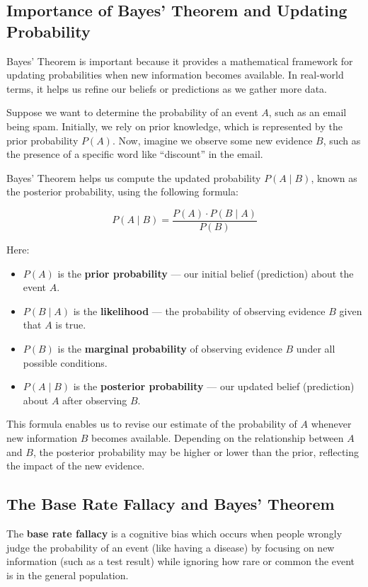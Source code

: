 \documentclass[twoside]{book}
\begin{document}
\subsection{Importance of Bayes' Theorem and Updating Probability}

Bayes’ Theorem is important because it provides a mathematical framework for updating probabilities when new information becomes available. In real-world terms, it helps us refine our beliefs or predictions as we gather more data.

Suppose we want to determine the probability of an event \( A \), such as an email being spam. Initially, we rely on prior knowledge, which is represented by the prior probability \( P(A) \). Now, imagine we observe some new evidence \( B \), such as the presence of a specific word like ``discount'' in the email.

Bayes' Theorem helps us compute the updated probability \( P(A \mid B) \), known as the posterior probability, using the following formula:

\[
P(A \mid B) = \frac{P(A) \cdot P(B \mid A)}{P(B)}
\]

Here:
\begin{itemize}
    \item \( P(A) \) is the \textbf{prior probability} — our initial belief (prediction) about the event \( A \).
    \item \( P(B \mid A) \) is the \textbf{likelihood} — the probability of observing evidence \( B \) given that \( A \) is true.
    \item \( P(B) \) is the \textbf{marginal probability} of observing evidence \( B \) under all possible conditions.
    \item \( P(A \mid B) \) is the \textbf{posterior probability} — our updated belief (prediction)  about \( A \) after observing \( B \).
\end{itemize}

This formula enables us to revise our estimate of the probability of \( A \) whenever new information \( B \) becomes available. Depending on the relationship between \( A \) and \( B \), the posterior probability may be higher or lower than the prior, reflecting the impact of the new evidence.

\subsection{The Base Rate Fallacy and Bayes' Theorem}

\begin{textbox}
The \textbf{base rate fallacy} is a cognitive bias which occurs when people wrongly judge the probability of an event (like having a disease) by focusing on new information (such as a test result) while ignoring how rare or common the event is in the general population.
\end{textbox}
\end{document}
